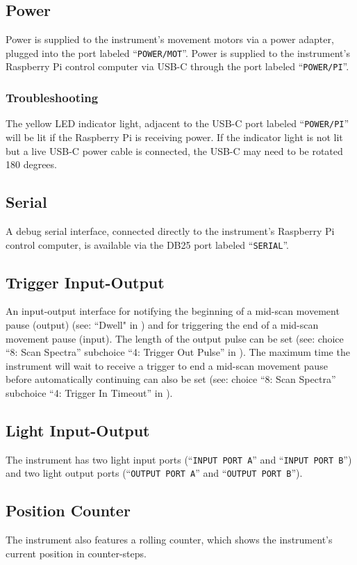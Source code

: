 \documentclass{article}
\begin{document}
\subsection{Power}

Power is supplied to the instrument's movement motors via a power adapter, plugged into the port labeled ``\verb|POWER/MOT|''. Power is supplied to the instrument's Raspberry Pi control computer via USB-C through the port labeled ``\verb|POWER/PI|''. 

\subsubsection{Troubleshooting}

The yellow LED indicator light, adjacent to the USB-C port labeled ``\verb|POWER/PI|'' will be lit if the Raspberry Pi is receiving power. If the indicator light is not lit but a live USB-C power cable is connected, the USB-C may need to be rotated 180 degrees.

\subsection{Serial}

A debug serial interface, connected directly to the instrument's Raspberry Pi control computer, is available via the DB25 port labeled ``\verb|SERIAL|''.

\subsection{Trigger Input-Output} \label{subsection:triggerio}

An input-output interface for notifying the beginning of a mid-scan movement pause (output) (see: ``Dwell" in ) and for triggering the end of a mid-scan movement pause (input). The length of the output pulse can be set (see: choice ``8: Scan Spectra'' subchoice ``4: Trigger Out Pulse'' in ). The maximum time the instrument will wait to receive a trigger to end a mid-scan movement pause before automatically continuing can also be set (see: choice ``8: Scan Spectra'' subchoice ``4: Trigger In Timeout'' in ).

\subsection{Light Input-Output}

The instrument has two light input ports (``\verb|INPUT PORT A|'' and ``\verb|INPUT PORT B|'') and two light output ports (``\verb|OUTPUT PORT A|'' and ``\verb|OUTPUT PORT B|'').

\subsection{Position Counter}

The instrument also features a rolling counter, which shows the instrument's current position in counter-steps.
\end{document}
